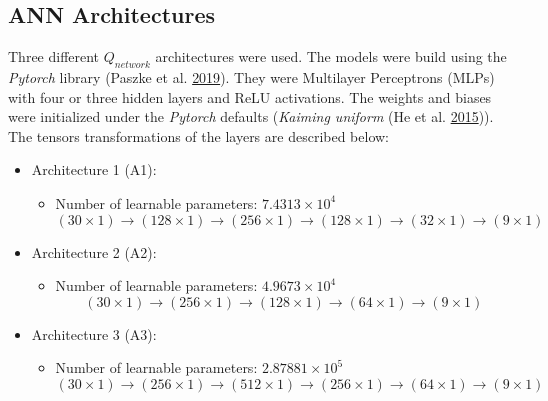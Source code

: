 \documentclass[
  12pt,
  openany]{book}
\providecommand{\tightlist}{%
  \setlength{\itemsep}{0pt}\setlength{\parskip}{0pt}}
\begin{document}
\hypertarget{ann-architectures}{%
\subsection{ANN Architectures}\label{ann-architectures}}

Three different \(Q_{network}\) architectures were used. The models were build using the \emph{Pytorch} library (Paszke et al. \protect\hyperlink{ref-NEURIPS2019_9015}{2019}). They were Multilayer Perceptrons (MLPs) with four or three hidden layers and ReLU activations. The weights and biases were initialized under the \emph{Pytorch} defaults (\emph{Kaiming uniform} (He et al. \protect\hyperlink{ref-he2015delving}{2015})). The tensors transformations of the layers are described below:

\begin{itemize}
\tightlist
\item
  Architecture 1 (A1):

  \begin{itemize}
  \tightlist
  \item
    Number of learnable parameters: \ensuremath{7.4313\times 10^{4}}
    \[(30 \times 1) \to (128 \times 1) \to (256 \times 1) \to (128 \times 1) \to (32 \times 1) \to (9 \times 1)\]
  \end{itemize}
\item
  Architecture 2 (A2):

  \begin{itemize}
  \tightlist
  \item
    Number of learnable parameters: \ensuremath{4.9673\times 10^{4}}
    \[(30 \times 1) \to (256 \times 1) \to (128 \times 1) \to (64 \times 1) \to (9 \times 1)\]
  \end{itemize}
\item
  Architecture 3 (A3):

  \begin{itemize}
  \tightlist
  \item
    Number of learnable parameters: \ensuremath{2.87881\times 10^{5}}
    \[(30 \times 1) \to (256 \times 1) \to (512 \times 1) \to (256 \times 1) \to (64 \times 1) \to (9 \times 1)\]
  \end{itemize}
\end{itemize}
\end{document}
